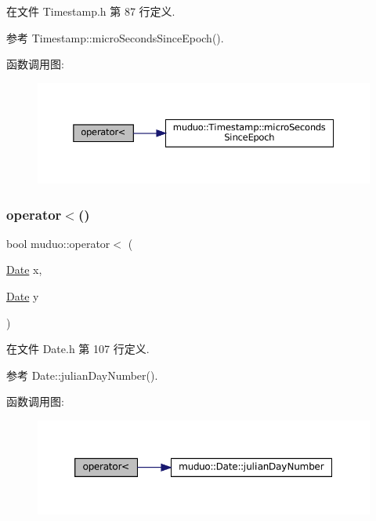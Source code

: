 在文件 Timestamp.\+h 第 87 行定义.



参考 Timestamp\+::micro\+Seconds\+Since\+Epoch().

函数调用图\+:
\nopagebreak
\begin{figure}[H]
\begin{center}
\leavevmode
\includegraphics[width=350pt]{namespacemuduo_a7cdae651f87c159c785591256d06740e_cgraph}
\end{center}
\end{figure}
\mbox{\label{namespacemuduo_a16d6a8ea1b5e79c94c59f96137b8d26d}} 
\subsubsection{\texorpdfstring{operator$<$()}{operator<()}\hspace{0.1cm}{\footnotesize\ttfamily [2/2]}}
{\footnotesize\ttfamily bool muduo\+::operator$<$ (\begin{DoxyParamCaption}\item[{\hyperlink{classmuduo_1_1Date}{Date}}]{x,  }\item[{\hyperlink{classmuduo_1_1Date}{Date}}]{y }\end{DoxyParamCaption})\hspace{0.3cm}{\ttfamily [inline]}}



在文件 Date.\+h 第 107 行定义.



参考 Date\+::julian\+Day\+Number().

函数调用图\+:
\nopagebreak
\begin{figure}[H]
\begin{center}
\leavevmode
\includegraphics[width=350pt]{namespacemuduo_a16d6a8ea1b5e79c94c59f96137b8d26d_cgraph}
\end{center}
\end{figure}
\mbox{\label{namespacemuduo_a8306fbe1f821ddb82e4c161f936695b2}} 
